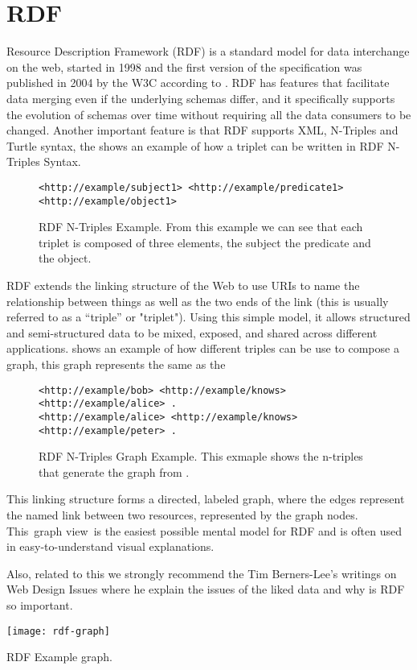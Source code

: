 \section{RDF}
Resource Description Framework (RDF) is a standard model for data interchange on the web, started in 1998 and the first version of the specification was published in 2004 by the W3C according to . RDF has features that facilitate data merging even if the underlying schemas differ, and it specifically supports the evolution of schemas over time without requiring all the data consumers to be changed. Another important feature is that RDF supports XML, N-Triples and Turtle syntax, the  shows an example of how a triplet can be written in RDF N-Triples Syntax.

\begin{figure}[hb]
\begin{lstlisting}
<http://example/subject1> <http://example/predicate1> <http://example/object1>
\end{lstlisting}
\caption[RDF N-Triples Example]{RDF N-Triples Example. From this example we can see that each triplet is composed of three elements, the subject the predicate and the object.}
\end{figure}

RDF extends the linking structure of the Web to use URIs to name the relationship between things as well as the two ends of the link (this is usually referred to as a “triple” or "triplet"). Using this simple model, it allows structured and semi-structured data to be mixed, exposed, and shared across different applications.  shows an example of how different triples can be use to compose a graph, this graph represents the same as the 

\begin{figure}[hb]
\begin{lstlisting}
<http://example/bob> <http://example/knows> <http://example/alice> .
<http://example/alice> <http://example/knows> <http://example/peter> .
\end{lstlisting}
\caption[RDF N-Triples Graph Example]{RDF N-Triples Graph Example. This exmaple shows the n-triples that generate the graph from .}
\end{figure}

This linking structure forms a directed, labeled graph, where the edges represent the named link between two resources, represented by the graph nodes. This graph view is the easiest possible mental model for RDF and is often used in easy-to-understand visual explanations.

Also, related to this we strongly recommend the Tim Berners-Lee’s writings on Web Design Issues  where he explain the issues of the liked data and why is RDF so important.

\begin{marginfigure}
\texttt{[image: rdf-graph]}
\caption[RDF Example graph]{RDF Example graph.}
\end{marginfigure}
